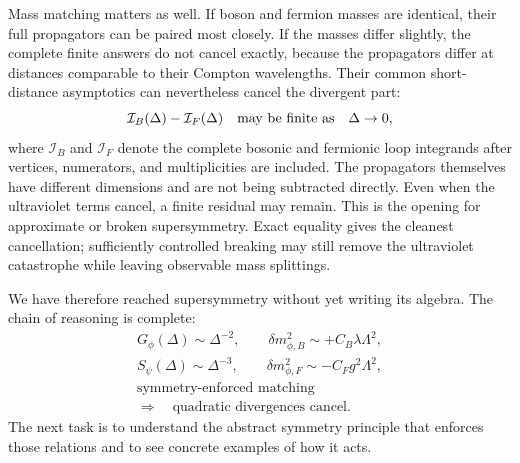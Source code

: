 Mass matching matters as well. If boson and fermion masses are identical, their full propagators can be paired most closely. If the masses differ slightly, the complete finite answers do not cancel exactly, because the propagators differ at distances comparable to their Compton wavelengths. Their common short-distance asymptotics can nevertheless cancel the divergent part:
\begin{equation}
\mathcal I_B(\Delta)-\mathcal I_F(\Delta)
\quad\hbox{may be finite as}\quad \Delta\to0,
\end{equation}
where \(\mathcal I_B\) and \(\mathcal I_F\) denote the complete bosonic and fermionic loop integrands after vertices, numerators, and multiplicities are included. The propagators themselves have different dimensions and are not being subtracted directly. Even when the ultraviolet terms cancel, a finite residual may remain. This is the opening for approximate or broken supersymmetry. Exact equality gives the cleanest cancellation; sufficiently controlled breaking may still remove the ultraviolet catastrophe while leaving observable mass splittings.

We have therefore reached supersymmetry without yet writing its algebra. The chain of reasoning is complete:
\begin{equation}
\begin{gathered}
G_\phi(\Delta)\sim \Delta^{-2},
\qquad
\delta m_{\phi,B}^2\sim+C_B\lambda\Lambda^2,\\[0.4em]
S_\psi(\Delta)\sim \Delta^{-3},
\qquad
\delta m_{\phi,F}^2\sim-C_Fg^2\Lambda^2,\\[0.4em]
\text{symmetry-enforced matching}\\
\Longrightarrow\quad
\text{quadratic divergences cancel}.
\end{gathered}
\end{equation}
The next task is to understand the abstract symmetry principle that enforces those relations and to see concrete examples of how it acts.

